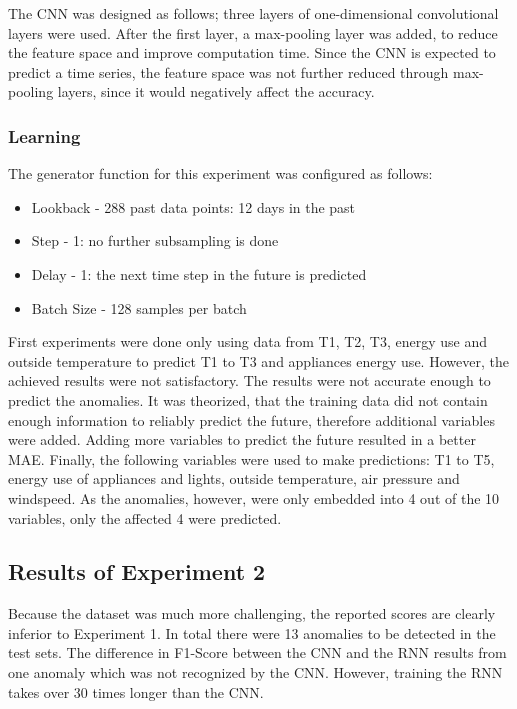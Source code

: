 The CNN was designed as follows; three layers of one-dimensional convolutional layers were used. After the first layer, a max-pooling layer was added, to reduce the feature space and improve computation time. Since the CNN is expected to predict a time series, the feature space was not further reduced through max-pooling layers, since it would negatively affect the accuracy.  

\subsubsection{Learning}
The generator function for this experiment was configured as follows:

\begin{itemize}
	\item Lookback - 288 past data points: 12 days in the past
	\item Step - 1: no further subsampling is done
	\item Delay - 1: the next time step in the future is predicted
	\item Batch Size - 128 samples per batch
\end{itemize}

First experiments were done only using data from T1, T2, T3, energy use and outside temperature to predict T1 to T3 and appliances energy use. However, the achieved results were not satisfactory. The results were not accurate enough to predict the anomalies. It was theorized, that the training data did not contain enough information to reliably predict the future, therefore additional variables were added. Adding more variables to predict the future resulted in a better MAE. Finally, the following variables were used to make predictions: T1 to T5, energy use of appliances and lights, outside temperature, air pressure and windspeed. As the anomalies, however, were only embedded into 4 out of the 10 variables, only the affected 4 were predicted.


\subsection{Results of Experiment 2}
Because the dataset was much more challenging, the reported scores are clearly inferior to Experiment 1. In total there were 13 anomalies to be detected in the test sets. The difference in F1-Score between the CNN and the RNN results from one anomaly which was not recognized by the CNN. However, training the RNN takes over 30 times longer than the CNN.

